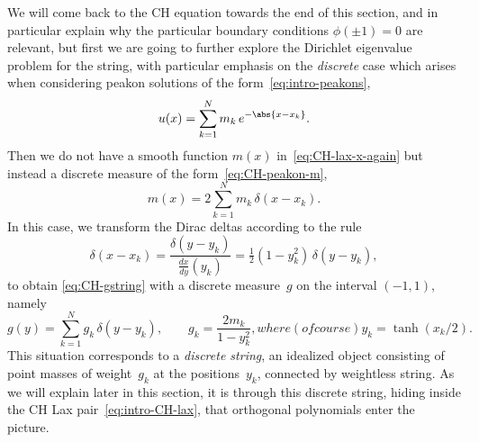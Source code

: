 \documentclass[10pt,a4paper]{article} \pdfoutput=1 
\begin{document}
We will come back to the CH equation towards the end of this section,
and in particular explain why the particular boundary conditions $\phi(\pm 1)=0$
are relevant,
but first we are going to further explore the Dirichlet eigenvalue problem for the string,
with particular emphasis on the \emph{discrete} case which arises when
considering peakon solutions of the form~\eqref{eq:intro-peakons},
\begin{equation*}
  u(x) = \sum_{k=1}^N m_k \, e^{-\abs{x-x_k}}
  .
\end{equation*}
Then we do not have a smooth function $m(x)$ in~\eqref{eq:CH-lax-x-again}
but instead a discrete measure of the form~\eqref{eq:CH-peakon-m},
\begin{equation*}
  m(x) = 2 \sum_{k=1}^N m_k \, \delta(x-x_k)
  .
\end{equation*}
In this case, we transform the Dirac deltas according to the rule
\begin{equation}
  \label{eq:CH-dirac-transform-rule}
  \delta(x-x_k) = \frac{\delta(y-y_k)}{\frac{dx}{dy}(y_k)}
  = \tfrac12 (1-y_k^2) \, \delta(y-y_k)
  ,
\end{equation}
to obtain \eqref{eq:CH-gstring} with a discrete measure~$g$ on the interval $(-1,1)$,
namely
\begin{subequations}
  \label{eq:CH-peakon-gk-yk}
\begin{equation}
  \label{eq:CH-peakon-g}
  g(y) = \sum_{k=1}^N g_k \, \delta(y-y_k)
  ,\qquad
  g_k = \frac{2 m_k}{1-y_k^2}
  ,
\end{equation}
where (of course)
\begin{equation}
  y_k = \tanh(x_k/2)
  .
\end{equation}
\end{subequations}
This situation corresponds to a \emph{discrete string},
an idealized object consisting of point masses of weight~$g_k$ at the positions~$y_k$,
connected by weightless string.
As we will explain later in this section,
it is through this discrete string,
hiding inside the CH Lax pair~\eqref{eq:intro-CH-lax},
that orthogonal polynomials enter the picture.
\end{document}
